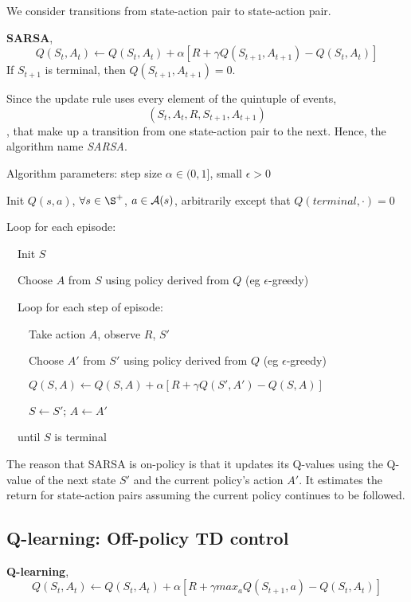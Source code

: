 \documentclass[sutton_barto_notes.tex]{subfiles}
\begin{document}
We consider transitions from state-action pair to state-action pair.

\begin{definition}
\textbf{SARSA},
$$ Q(S_t, A_t) \leftarrow Q(S_t, A_t) + \alpha [ R + \gamma Q( S_{t+1}, A_{t+1}) - Q(S_t, A_t)]$$
If $S_{t+1}$ is terminal, then $Q(S_{t+1}, A_{t+1}) = 0$.
\end{definition}

Since the update rule uses every element of the quintuple of events, $$(S_t, A_t, R, S_{t+1}, A_{t+1})$$, that make up a transition from one state-action pair to the next. Hence, the algorithm name \textit{SARSA}.

\begin{tcolorbox}[width=1.1\textwidth,title={SARSA (on-policy TD control} for estimating $Q\approx q_*$]
Algorithm parameters: step size $\alpha \in (0,1]$, small $\epsilon > 0$

Init $Q(s,a)$, $\forall s \in \S^+$, $a \in \operatorname*{\mathcal{A}}(s)$, arbitrarily except that $Q(terminal,\cdot)=0$

Loop for each episode:

$\quad$Init $S$

$\quad$Choose $A$ from $S$ using policy derived from $Q$ (eg $\epsilon$-greedy)

$\quad$Loop for each step of episode:

$\quad\quad$Take action $A$, observe $R$, $S'$

$\quad\quad$Choose $A'$ from $S'$ using policy derived from $Q$ (eg $\epsilon$-greedy)

$\quad\quad Q(S, A) \leftarrow Q(S, A) + \alpha [ R + \gamma Q( S', A') - Q(S, A)]$

$\quad\quad S \leftarrow S'$; $A \leftarrow A'$

$\quad$until $S$ is terminal
\end{tcolorbox}

The reason that SARSA is on-policy is that it updates its Q-values using the Q-value of the next state $S'$ and the current policy's action $A'$. It estimates the return for state-action pairs assuming the current policy continues to be followed.

\subsection{Q-learning: Off-policy TD control}

\begin{definition}
\textbf{Q-learning},
$$Q(S_t,A_t)\leftarrow Q(S_t, A_t)+\alpha [R + \gamma max_a Q(S_{t+1}, a) - Q(S_t, A_t)]$$
\end{definition}
\end{document}
